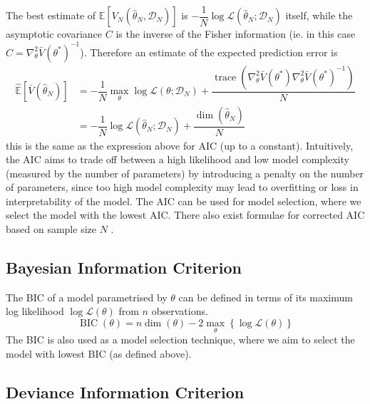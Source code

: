 \documentclass[11pt]{report} %
\begin{document}
The best estimate of $\mathbb{E}\left[V_{N}\left(\hat{\theta}_{N}, \mathcal{D}_{N}\right)\right]$ is $-\dfrac{1}{N}\log\mathcal{L}\left(\hat{\theta}_{N}; \mathcal{D}_{N}\right)$ itself, while the asymptotic covariance $C$ is the inverse of the Fisher information (ie. in this case $C = \nabla_{\theta}^{2}\bar{V}\left(\theta^{*}\right)^{-1}$). Therefore an estimate of the expected prediction error is
\begin{align}
\widehat{\mathbb{E}}\left[\bar{V}\left(\hat{\theta}_{N}\right)\right] &= -\dfrac{1}{N}\max_{\theta}\log\mathcal{L}\left(\theta; \mathcal{D}_{N}\right) + \dfrac{\operatorname{trace}\left(\nabla_{\theta}^{2}\bar{V}\left(\theta^{*}\right)\nabla_{\theta}^{2}\bar{V}\left(\theta^{*}\right)^{-1}\right)}{N} \\
&= -\dfrac{1}{N}\log\mathcal{L}\left(\hat{\theta}_{N}; \mathcal{D}_{N}\right) + \dfrac{\dim\left(\hat{\theta}_{N}\right)}{N}
\end{align}
this is the same as the expression above for AIC (up to a constant). Intuitively, the AIC aims to trade off between a high likelihood and low model complexity (measured by the number of parameters) by introducing a penalty on the number of parameters, since too high model complexity may lead to overfitting or loss in interpretability of the model. The AIC can be used for model selection, where we select the model with the lowest AIC. There also exist formulae for corrected AIC based on sample size $N$ \cite{Claeskens2008}.

\subsection{Bayesian Information Criterion}

The BIC of a model parametrised by $\theta$ can be defined in terms of its maximum log likelihood $\log\mathcal{L}\left(\theta\right)$ from $n$ observations.
\begin{equation}
\operatorname{BIC}\left(\theta\right) = n\dim\left(\theta\right) - 2\max_{\theta}\left\{\log\mathcal{L}\left(\theta\right)\right\}
\end{equation}
The BIC is also used as a model selection technique, where we aim to select the model with lowest BIC (as defined above).

\subsection{Deviance Information Criterion}
\end{document}
